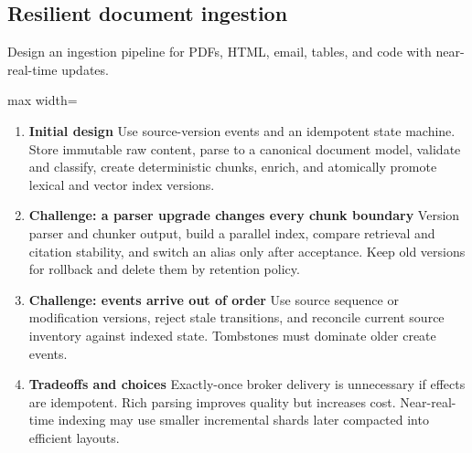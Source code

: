 \subsection{Resilient document ingestion}
Design an ingestion pipeline for PDFs, HTML, email, tables, and code with near-real-time updates.
\begin{center}\begin{adjustbox}{max width=\linewidth}\end{adjustbox}\end{center}
\begin{enumerate}
\item \textbf{Initial design} Use source-version events and an idempotent state machine. Store immutable raw content, parse to a canonical document model, validate and classify, create deterministic chunks, enrich, and atomically promote lexical and vector index versions.
\item \textbf{Challenge: a parser upgrade changes every chunk boundary} Version parser and chunker output, build a parallel index, compare retrieval and citation stability, and switch an alias only after acceptance. Keep old versions for rollback and delete them by retention policy.
\item \textbf{Challenge: events arrive out of order} Use source sequence or modification versions, reject stale transitions, and reconcile current source inventory against indexed state. Tombstones must dominate older create events.
\item \textbf{Tradeoffs and choices} Exactly-once broker delivery is unnecessary if effects are idempotent. Rich parsing improves quality but increases cost. Near-real-time indexing may use smaller incremental shards later compacted into efficient layouts.
\end{enumerate}
